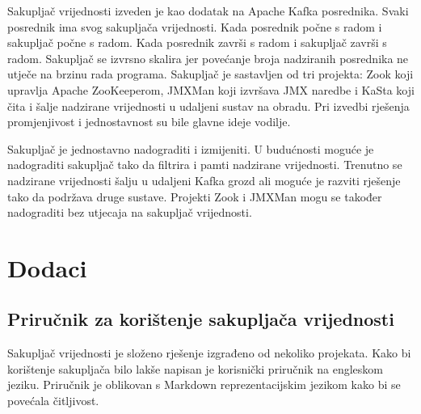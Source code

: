 \documentclass[utf8, diplomski, lmodern, numeric]{fer}
\begin{document}
Sakupljač vrijednosti izveden je kao dodatak na Apache Kafka posrednika. Svaki posrednik ima svog sakupljača vrijednosti. Kada posrednik počne s radom i sakupljač počne s radom. Kada posrednik završi s radom i sakupljač završi s radom. Sakupljač se izvrsno skalira jer povećanje broja nadziranih posrednika ne utječe na brzinu rada programa. Sakupljač je sastavljen od tri projekta: Zook koji upravlja Apache ZooKeeperom, JMXMan koji izvršava JMX naredbe i KaSta koji čita i šalje nadzirane vrijednosti u udaljeni sustav na obradu. Pri izvedbi rješenja promjenjivost i jednostavnost su bile glavne ideje vodilje.

Sakupljač je jednostavno nadograditi i izmijeniti. U budućnosti moguće je nadograditi sakupljač tako da filtrira i pamti nadzirane vrijednosti. Trenutno se nadzirane vrijednosti šalju u udaljeni Kafka grozd ali moguće je razviti rješenje tako da podržava druge sustave. Projekti Zook i JMXMan mogu se također nadograditi bez utjecaja na sakupljač vrijednosti.



\chapter{Dodaci}


\section{Priručnik za korištenje sakupljača vrijednosti}

Sakupljač vrijednosti je složeno rješenje izgrađeno od nekoliko projekata. Kako bi korištenje sakupljača bilo lakše napisan je korisnički priručnik na engleskom jeziku. Priručnik je oblikovan s Markdown reprezentacijskim jezikom kako bi se povećala čitljivost.
\end{document}
